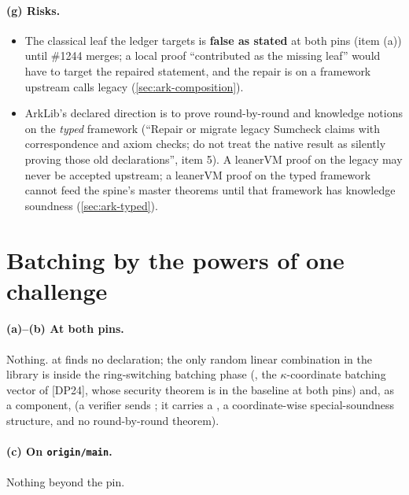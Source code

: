 \paragraph{(g) Risks.}
\begin{itemize}
\item The classical leaf the ledger targets is \textbf{false as stated} at both pins (item (a))
  until \#1244 merges; a local proof ``contributed as the missing leaf'' would have to target the
  repaired statement, and the repair is on a framework upstream calls legacy
  (\cref{sec:ark-composition}).
\item ArkLib's declared direction is to prove round-by-round and knowledge notions on the
  \emph{typed} framework (``Repair or migrate legacy Sumcheck claims with correspondence and
  axiom checks; do not treat the native result as silently proving those old declarations'',
   item 5). A leanerVM proof on the legacy  may never be accepted
  upstream; a leanerVM proof on the typed framework cannot feed the spine's master theorems until
  that framework has knowledge soundness (\cref{sec:ark-typed}).
\end{itemize}

\section{Batching by the powers of one challenge}\label{sec:ark-batching}

\paragraph{(a)--(b) At both pins.}
Nothing.  at  finds no declaration; the only
random linear combination in the library is inside the ring-switching batching phase
(, the $\kappa$-coordinate batching vector of
[DP24], whose security theorem
 is in the
baseline at both pins) and, as a component,  (a verifier sends
; it carries a , a coordinate-wise
special-soundness structure, and no round-by-round theorem).

\paragraph{(c) On \texttt{origin/main}.}
Nothing beyond the pin.

